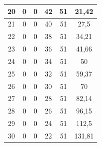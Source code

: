 \begin{table}[]
\begin{tabular}{|c|c|c|c|c|c|}
 			20                                           & 0                      & 0                     & 42                    & 51                     & 21,42                                        \\ \hline
 			21                                           & 0                      & 0                     & 40                    & 51                     & 27,5                                               \\ \hline
 			22                                           & 0                      & 0                     & 38                    & 51                     & 34,21                                       \\ \hline
 			23                                           & 0                      & 0                     & 36                    & 51                     & 41,66                                        \\ \hline
 			24                                           & 0                      & 0                     & 34                    & 51                     & 50                                                 \\ \hline
 			25                                           & 0                      & 0                     & 32                    & 51                     & 59,37                                             \\ \hline
 			26                                           & 0                      & 0                     & 30                    & 51                     & 70                                                 \\ \hline
 			27                                           & 0                      & 0                     & 28                    & 51                     & 82,14                                       \\ \hline
 			28                                           & 0                      & 0                     & 26                    & 51                     & 96,15                                        \\ \hline
 			29                                           & 0                      & 0                     & 24                    & 51                     & 112,5                                              \\ \hline
 			30                                           & 0                      & 0                     & 22                    & 51                     & 131,81                                       \\ \hline

\end{tabular}
\end{table}

